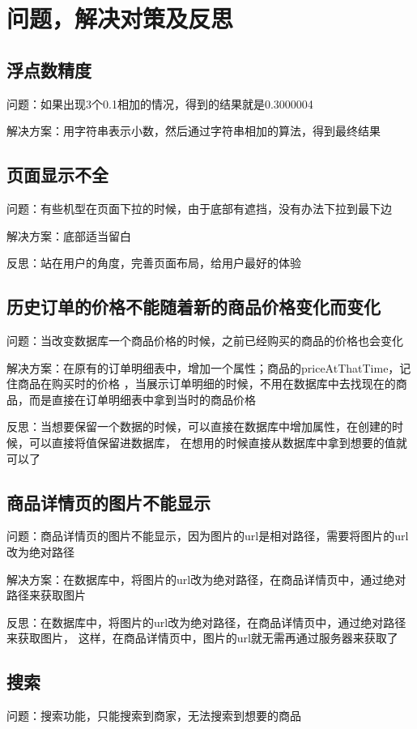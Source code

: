 \chapter{问题，解决对策及反思}

\section{浮点数精度}
问题：如果出现3个0.1相加的情况，得到的结果就是0.3000004

解决方案：用字符串表示小数，然后通过字符串相加的算法，得到最终结果

\section{页面显示不全}
问题：有些机型在页面下拉的时候，由于底部有遮挡，没有办法下拉到最下边

解决方案：底部适当留白

反思：站在用户的角度，完善页面布局，给用户最好的体验

\section{历史订单的价格不能随着新的商品价格变化而变化}
问题：当改变数据库一个商品价格的时候，之前已经购买的商品的价格也会变化

解决方案：在原有的订单明细表中，增加一个属性；商品的priceAtThatTime，记住商品在购买时的价格
，当展示订单明细的时候，不用在数据库中去找现在的商品，而是直接在订单明细表中拿到当时的商品价格

反思：当想要保留一个数据的时候，可以直接在数据库中增加属性，在创建的时候，可以直接将值保留进数据库，
在想用的时候直接从数据库中拿到想要的值就可以了


\section{商品详情页的图片不能显示}
问题：商品详情页的图片不能显示，因为图片的url是相对路径，需要将图片的url改为绝对路径

解决方案：在数据库中，将图片的url改为绝对路径，在商品详情页中，通过绝对路径来获取图片

反思：在数据库中，将图片的url改为绝对路径，在商品详情页中，通过绝对路径来获取图片，
这样，在商品详情页中，图片的url就无需再通过服务器来获取了

\section{搜索}
问题：搜索功能，只能搜索到商家，无法搜索到想要的商品

